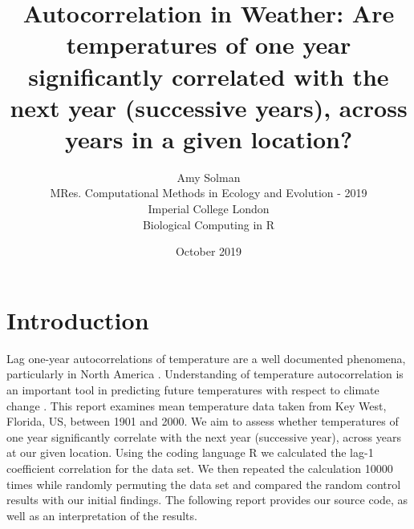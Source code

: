 \documentclass[12pt]{article}
\title{Autocorrelation in Weather: Are temperatures of one year significantly correlated with the next year (successive years), across years in a given location?}
\author{Amy Solman \\
MRes. Computational Methods in Ecology and Evolution - 2019\\
Imperial College London\\
Biological Computing in R}
\date{October 2019}
\begin{document}
	\maketitle

\section{Introduction}
Lag one-year autocorrelations of temperature are a well documented phenomena, particularly in North America \cite{madden1977estimates}. Understanding of temperature autocorrelation is an important tool in predicting future temperatures with respect to climate change \cite{mearns1984extreme}. This report examines mean temperature data taken from Key West, Florida, US, between 1901 and 2000. We aim to assess whether temperatures of one year significantly correlate with the next year (successive year), across years at our given location. Using the coding language R we calculated the lag-1 coefficient correlation for the data set. We then repeated the calculation 10000 times while randomly permuting the data set and compared the random control results with our initial findings. The following report provides our source code, as well as an interpretation of the results.
\end{document}
